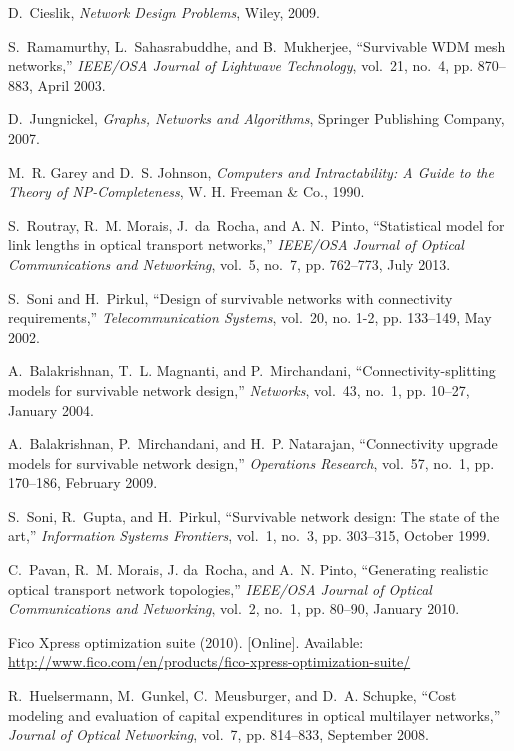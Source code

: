 \begin{thebibliography}{10}
D.~Cieslik, \emph{Network Design Problems}, Wiley, 2009.

S.~Ramamurthy, L.~Sahasrabuddhe, and B.~Mukherjee, ``Survivable WDM mesh networks,'' \emph{IEEE/OSA Journal of Lightwave Technology}, vol.~21, no.~4, pp. 870--883, April 2003.

D.~Jungnickel, \emph{Graphs, Networks and Algorithms}, Springer Publishing Company, 2007.

M.~R. Garey and D.~S. Johnson, \emph{Computers and Intractability: A Guide to the Theory of NP-Completeness}, W. H. Freeman \& Co., 1990.

S.~Routray, R.~M. Morais, J.~da~Rocha, and A. N.~Pinto, ``Statistical model for link lengths in optical transport networks,'' \emph{IEEE/OSA Journal of Optical Communications and
  Networking}, vol.~5, no.~7, pp. 762--773, July 2013.

\BIBentryALTinterwordspacing
S.~Soni and H.~Pirkul, ``Design of survivable networks with connectivity requirements,''  \emph{Telecommunication Systems}, vol.~20, no. 1-2, pp. 133--149, May 2002.

\BIBentryALTinterwordspacing
A.~Balakrishnan, T.~L. Magnanti, and P.~Mirchandani, ``Connectivity-splitting models for survivable network design,'' \emph{Networks}, vol.~43, no.~1, pp.
  10--27, January 2004.
\BIBentrySTDinterwordspacing

\BIBentryALTinterwordspacing
A.~Balakrishnan, P.~Mirchandani, and H.~P. Natarajan, ``Connectivity upgrade models for survivable network design,'' \emph{Operations Research}, vol.~57,
  no.~1, pp. 170--186, February 2009.

\BIBentryALTinterwordspacing
S.~Soni, R.~Gupta, and H.~Pirkul, ``Survivable network design: The state of the art,'' \emph{Information Systems Frontiers}, vol.~1, no.~3, pp. 303--315, October 1999.

C.~Pavan, R.~M. Morais, J. da~Rocha, and A.~N. Pinto, ``Generating realistic optical transport network topologies,'' \emph{IEEE/OSA Journal of
  Optical Communications and Networking}, vol.~2, no.~1, pp. 80--90, January 2010.

\BIBentryALTinterwordspacing
Fico Xpress optimization suite (2010). [Online]. Available: \url{http://www.fico.com/en/products/fico-xpress-optimization-suite/}
\BIBentrySTDinterwordspacing

R.~Huelsermann, M.~Gunkel, C.~Meusburger, and D.~A. Schupke, ``Cost modeling and evaluation of capital expenditures in optical multilayer networks,''
  \emph{Journal of Optical Networking}, vol.~7, pp. 814--833, September 2008.
\end{thebibliography}

